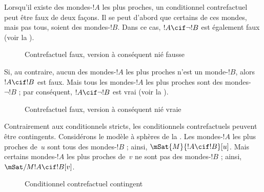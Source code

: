 \documentclass[../../../include/open-logic-section]{subfiles}
\begin{document}
Lorsqu'il existe des mondes-$!A$ les plus proches, un conditionnel
contrefactuel peut être faux de deux façons. Il se peut d'abord que
certains de ces mondes, mais pas tous, soient des mondes-$!B$. Dans ce
cas, $!A \cif \lnot !B$ est également faux (voir
la ).
\begin{figure}
\begin{center}
\caption{Contrefactuel faux, version à conséquent nié fausse}
\end{center}
\end{figure}
Si, au contraire, aucun des mondes-$!A$ les plus proches n'est un
monde-$!B$, alors $!A \cif !B$ est faux. Mais tous les mondes-$!A$ les
plus proches sont des mondes-$\lnot !B$ ; par conséquent,
$!A \cif \lnot !B$ est vrai
(voir la ).
\begin{figure}
\begin{center}
\caption{Contrefactuel faux, version à conséquent nié vraie}
\end{center}
\end{figure}

Contrairement aux conditionnels stricts, les conditionnels
contrefactuels peuvent être contingents. Considérons le modèle à
sphères de la . Les mondes-$!A$ les plus proches
de~$u$ sont tous des mondes-$!B$ ; ainsi, $\mSat{M}{!A \cif
  !B}[u]$. Mais certains mondes-$!A$ les plus proches de~$v$ ne sont
pas des mondes-$!B$ ; ainsi, $\mSat/{M}{!A \cif !B}[v]$.
\begin{figure}
\begin{center}
\end{center}
\caption{Conditionnel contrefactuel contingent}
\end{figure}
\end{document}

